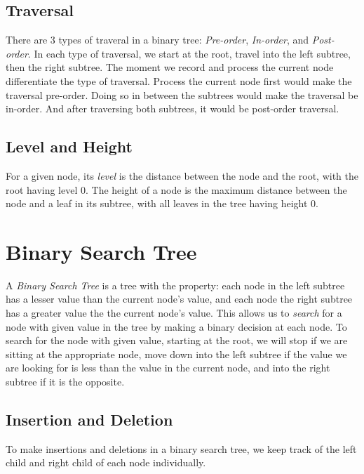 \documentclass{article}
\begin{document}
\subsection*{Traversal}
\label{traversal}

There are 3 types of traveral in a binary tree: \emph{Pre-order}, \emph{In-order}, and \emph{Post-order}. In each type of traversal, we start at the root, travel into the left subtree, then the right subtree. The moment we record and process the current node differentiate the type of traversal. Process the current node first would make the traversal pre-order. Doing so in between the subtrees would make the traversal be in-order. And after traversing both subtrees, it would be post-order traversal.

\subsection*{Level and Height}

For a given node, its \emph{level} is the distance between the node and the root, with the root having level 0. The height of a node is the maximum distance between the node and a leaf in its subtree, with all leaves in the tree having height 0.

\section{Binary Search Tree}
\label{binary_search_tree}

A \emph{Binary Search Tree} is a tree with the property: each node in the left subtree has a lesser value than the current node's value, and each node the right subtree has a greater value the the current node's value. This allows us to \emph{search} for a node with given value in the tree by making a binary decision at each node. To search for the node with given value, starting at the root, we will stop if we are sitting at the appropriate node, move down into the left subtree if the value we are looking for is less than the value in the current node, and into the right subtree if it is the opposite.

\subsection*{Insertion and Deletion}
\label{bst_insertion_deletion}

To make insertions and deletions in a binary search tree, we keep track of the left child and right child of each node individually.
\end{document}
